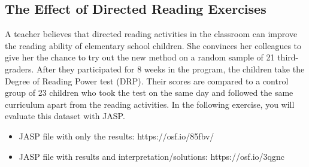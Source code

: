 \documentclass[
  letterpaper,
  DIV=11,
  numbers=noendperiod]{scrreprt}
\providecommand{\tightlist}{%
  \setlength{\itemsep}{0pt}\setlength{\parskip}{0pt}}\usepackage{longtable,booktabs,array}
\begin{document}
\hypertarget{the-effect-of-directed-reading-exercises}{%
\subsection{The Effect of Directed Reading
Exercises}\label{the-effect-of-directed-reading-exercises}}

A teacher believes that directed reading activities in the classroom can
improve the reading ability of elementary school children. She convinces
her colleagues to give her the chance to try out the new method on a
random sample of 21 third-graders. After they participated for 8 weeks
in the program, the children take the Degree of Reading Power test
(DRP). Their scores are compared to a control group of 23 children who
took the test on the same day and followed the same curriculum apart
from the reading activities. In the following exercise, you will
evaluate this dataset with JASP.

\begin{itemize}
\tightlist
\item
  JASP file with only the results: https://osf.io/85fbv/
\item
  JASP file with results and interpretation/solutions:
  https://osf.io/3qgnc
\end{itemize}
\end{document}
